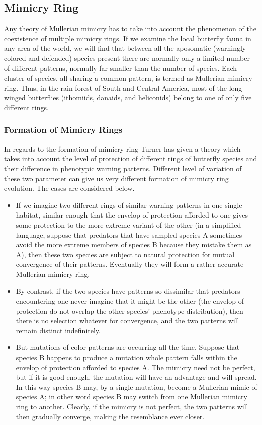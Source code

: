 \subsection{Mimicry Ring}
Any theory of Mullerian mimicry has to take into account the phenomenon of the coexistence of multiple mimicry rings. If we examine the local butterfly fauna in any area of the world, we will find that between all the aposomatic (warningly colored and defended) species present there are normally only a limited number of different patterns, normally far smaller than the number of species. Each cluster of species, all sharing a common pattern, is termed as Mullerian mimicry ring. Thus, in the rain forest of South and Central America, most of the long-winged butterflies (ithomiids, danaids, and heliconids) belong to one of only five different rings.

\subsubsection{Formation of Mimicry Rings}
In regards to the formation of mimicry ring Turner \cite{turner1988} has given a theory which takes into account the level of protection of different rings of butterfly species and their difference in phenotypic warning patterns. Different level of variation of these two parameter can give us very different formation of mimicry ring evolution. The cases are considered below.

\begin{itemize}
	\item If we imagine two different rings of similar warning patterns in one single habitat, similar enough that the envelop of protection afforded to one gives some protection to the more extreme variant of the other (in a simplified language, suppose that predators that have sampled species A sometimes avoid the more extreme members of species B because they mistake them as A), then these two species are subject to natural protection for mutual convergence of their patterns. Eventually they will form a rather accurate Mullerian mimicry ring.
	\item By contrast, if the two species have patterns so dissimilar that predators encountering one never imagine that it might be the other (the envelop of protection do not overlap the other species' phenotype distribution), then there is no selection whatever for convergence, and the two patterns will remain distinct indefinitely.
 \item But mutations of color patterns are occurring all the time. Suppose that species B happens to produce a mutation whole pattern falls within the envelop of protection afforded to species A. The mimicry need not be perfect, but if it is good enough, the mutation will have an advantage and will spread. In this way species B may, by a single mutation, become a Mullerian mimic of species A; in other word species B may switch from one Mullerian mimicry ring to another. Clearly, if the mimicry is not perfect, the two patterns will then gradually converge, making the resemblance ever closer. 
\end{itemize}

